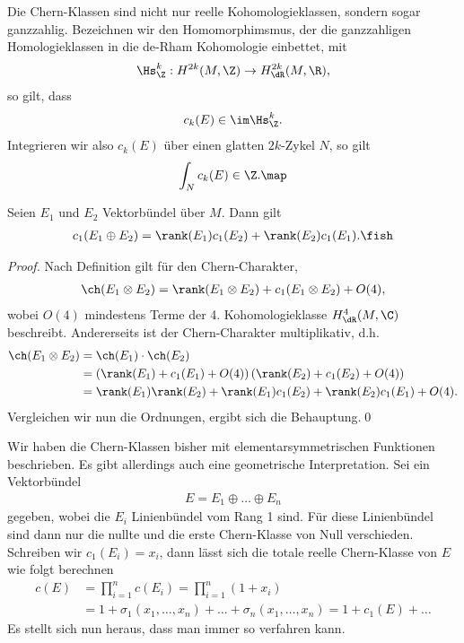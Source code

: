 \documentclass[%
	paper=a5,%
	fleqn,%
	DIV=18,%
	BCOR=0mm,
	fontsize=11pt,
	titlepage=false,%
	bibliography=totoc,
	DIV=18,%
	twoside=true,
	pdftitle=Riemannsche Geometrie,
	pdfauthor=Uwe Semmelmann,
	numbers=noendperiod]%
	{scrbook}
\begin{document}
\begin{rem}
Die Chern-Klassen sind nicht nur reelle Kohomologieklassen, sondern sogar ganzzahlig. Bezeichnen wir den Homomorphimsmus, der die ganzzahligen Homologieklassen in die de-Rham Kohomologie einbettet, mit
\begin{align*}
\Hs_{\Z}^k : H^{2k}(M,\Z) \to H_{\dR}^{2k}(M,\R),
\end{align*}
so gilt, dass
\begin{align*}
c_{k}(E) \in \im \Hs_{\Z}^k.
\end{align*}
Integrieren wir also $c_{k}(E)$ über einen glatten $2k$-Zykel $N$, so gilt
\begin{align*}
\int_{N} c_{k}(E) \in \Z.\map
\end{align*}
\end{rem}

\begin{lem}
Seien $E_{1}$ und $E_{2}$ Vektorbündel über $M$. Dann gilt
\begin{align*}
c_{1}(E_{1}\oplus E_{2}) = \rank(E_{1})c_{1}(E_{2}) + \rank(E_{2})c_{1}(E_{1}).\fish
\end{align*}
\end{lem}
\begin{proof}
Nach Definition gilt für den Chern-Charakter,
\begin{align*}
\ch(E_{1}\otimes E_{2}) = \rank(E_{1}\otimes E_{2}) + c_{1}(E_{1}\otimes E_{2}) + O(4),
\end{align*}
wobei $O(4)$ mindestens Terme der 4. Kohomologieklasse $H_{\dR}^4(M,\C)$ beschreibt. Andererseits ist der Chern-Charakter multiplikativ, d.h.
\begin{align*}
\ch(E_{1}\otimes E_{2}) &= \ch(E_{1})\cdot \ch(E_{2})\\
&= 
\left( \rank(E_{1}) + c_{1}(E_{1}) + O(4)\right)
\left( \rank(E_{2}) + c_{1}(E_{2}) + O(4)\right)\\
&= \rank(E_{1})\rank(E_{2}) + 
\rank(E_{1})c_{1}(E_{2}) + \rank(E_{2})c_{1}(E_{1}) + O(4).
\end{align*}
Vergleichen wir nun die Ordnungen, ergibt sich die Behauptung.\qed
\end{proof}

Wir haben die Chern-Klassen bisher mit elementarsymmetrischen Funktionen beschrieben. Es gibt allerdings auch eine geometrische Interpretation. Sei ein Vektorbündel
\begin{align*}
E = E_{1}\oplus \ldots \oplus E_{n}
\end{align*}
gegeben, wobei die $E_{i}$ Linienbündel vom Rang 1 sind. Für diese Linienbündel sind dann nur die nullte und die erste Chern-Klasse von Null verschieden. Schreiben wir $c_{1}(E_{i}) = x_{i}$, dann lässt sich die totale reelle Chern-Klasse von $E$ wie folgt berechnen
\begin{align*}
c(E) &= \prod_{i=1}^n c(E_{i}) = 
\prod_{i=1}^n (1+x_{i})\\
&= 1 + \sigma_{1}(x_{1},\ldots,x_{n}) + \ldots + \sigma_{n}(x_{1},\ldots,x_{n})
= 1 + c_{1}(E) + \ldots
\end{align*}
Es stellt sich nun heraus, dass man immer so verfahren kann.
\end{document}
